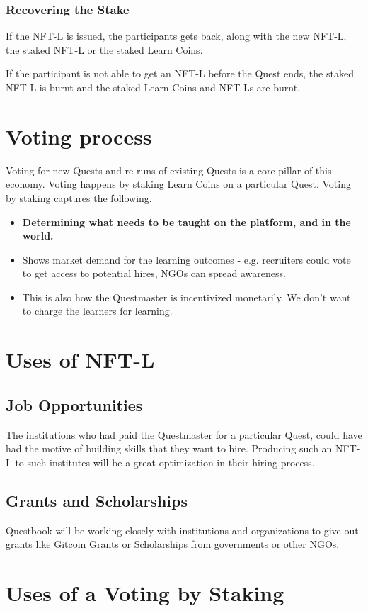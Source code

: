 \documentclass{article}
\begin{document}
        \subsubsection{Recovering the Stake}
          If the NFT-L is issued, the participants gets back, along with the new NFT-L, the staked NFT-L or the staked Learn Coins.
          \par
          If the participant is not able to get an NFT-L before the Quest ends, the staked NFT-L is burnt and the staked Learn Coins and NFT-Ls are burnt.
  \section{Voting process}
    Voting for new Quests and re-runs of existing Quests is a core pillar of this economy. 
    Voting happens by staking Learn Coins on a particular Quest.
    Voting by staking captures the following.
    \begin{itemize}
      \item \textbf{Determining what needs to be taught on the platform, and in the world.}
      \item Shows market demand for the learning outcomes - e.g. recruiters could vote to get access to potential hires,  NGOs can spread awareness.
      \item This is also how the Questmaster is incentivized monetarily. We don't want to charge the learners for learning.
    \end{itemize}
  \section{Uses of NFT-L}
    \subsection{Job Opportunities}
      The institutions who had paid the Questmaster for a particular Quest, could have had the motive of building skills that they want to hire. Producing such an NFT-L to such institutes will be a great optimization in their hiring process.
    \subsection{Grants and Scholarships}
      Questbook will be working closely with institutions and organizations to give out grants like Gitcoin Grants or Scholarships from governments or other NGOs.
  \section{Uses of a Voting by Staking}
\end{document}
